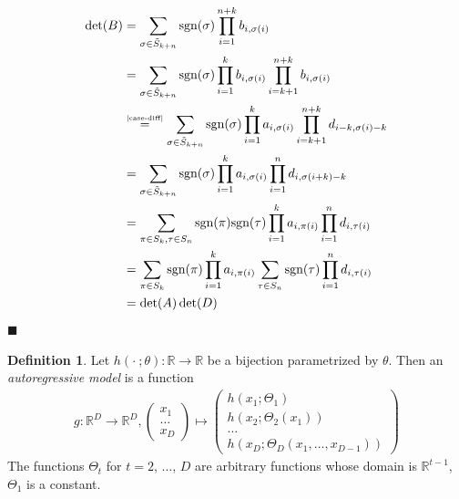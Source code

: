 \documentclass[12pt, a4paper]{article}
\numberwithin{equation}{section}
\theoremstyle{definition}
\theoremstyle{definition}
\newtheorem{defn}[thm]{Definition} %
\begin{document}
	\begin{align}
		\det(B) &= \sum_{\sigma\in\tilde{S}_{k+n}}\text{sgn}(\sigma)\prod_{i = 1}^{n+k}b_{i, \sigma(i)}
		\\ &= \sum_{\sigma\in\tilde{S}_{k+n}}\text{sgn}(\sigma)\prod_{i = 1}^{k}b_{i, \sigma(i)}\prod_{i = k+1}^{n+k}b_{i, \sigma(i)}
		\\ &\overset{\tiny\eqref{case-diff}}{=} \sum_{\sigma\in\tilde{S}_{k+n}}\text{sgn}(\sigma)\prod_{i = 1}^{k}a_{i, \sigma(i)}\prod_{i=k+1}^{n+k}d_{i-k, \sigma(i)-k}
		\\ &= \sum_{\sigma\in\tilde{S}_{k+n}}\text{sgn}(\sigma)\prod_{i = 1}^{k}a_{i, \sigma(i)}\prod_{i = 1}^{n}d_{i, \sigma(i+k)-k}
		\\ &= \sum_{\pi\in S_k, \tau\in S_n}\text{sgn}(\pi)\text{sgn}(\tau)\prod_{i = 1}^{k}a_{i, \pi(i)}\prod_{i = 1}^{n}d_{i, \tau(i)}
		\\ &= \sum_{\pi\in S_k}\text{sgn}(\pi)\prod_{i = 1}^{k}a_{i, \pi(i)}\sum_{\tau\in S_n}\text{sgn}(\tau)\prod_{i = 1}^{n}d_{i, \tau(i)}
		\\ &= \det(A)\det(D)
	\end{align}
	\cite{block-triangular-matrix}
	\qquad\qquad\qquad\qquad\qquad\qquad\qquad\qquad\qquad\qquad\qquad\qquad\qquad\qquad\qquad\qquad\qquad\qquad\qquad\qquad\qquad\quad$\blacksquare$
	
	\begin{defn}
		Let $h(\bm{\cdot}\ ; \theta): \mathbb{R}\rightarrow\mathbb{R}$ be a bijection parametrized by $\theta$. Then an \textit{autoregressive model} is a function \begin{align}
			g: \mathbb{R}^D\rightarrow\mathbb{R}^D, \begin{pmatrix}
				x_1 \\ \dots \\ x_D 
			\end{pmatrix} \mapsto 
			\begin{pmatrix}
				h\left(x_1; \Theta_1\right) \\ h\left(x_2; 	\Theta_2\left(x_1\right)\right) \\ \dots \\ h\left(x_D; \Theta_D\left(x_1, \dots, x_{D-1}\right)\right)
			\end{pmatrix}
		\end{align}
		The functions $\Theta_t$ for $t = 2$, $\dots$, $D$ are arbitrary functions whose domain is $\mathbb{R}^{t-1}$, $\Theta_1$ is a constant. 
	\end{defn}
\end{document}
